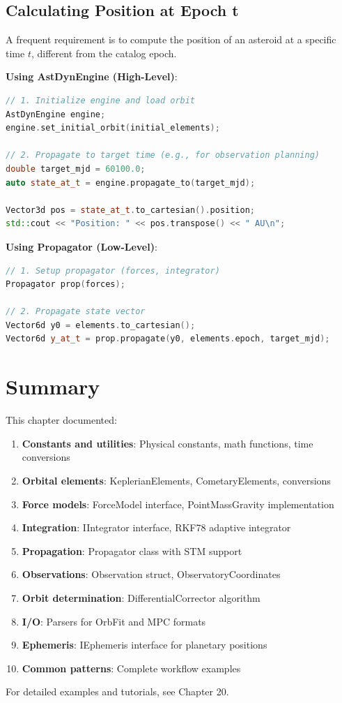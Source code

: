 \subsection{Calculating Position at Epoch t}

A frequent requirement is to compute the position of an asteroid at a specific time $t$, different from the catalog epoch.

\textbf{Using AstDynEngine (High-Level)}:
\begin{lstlisting}[language=C++]
// 1. Initialize engine and load orbit
AstDynEngine engine;
engine.set_initial_orbit(initial_elements);

// 2. Propagate to target time (e.g., for observation planning)
double target_mjd = 60100.0;
auto state_at_t = engine.propagate_to(target_mjd);

Vector3d pos = state_at_t.to_cartesian().position;
std::cout << "Position: " << pos.transpose() << " AU\n";
\end{lstlisting}

\textbf{Using Propagator (Low-Level)}:
\begin{lstlisting}[language=C++]
// 1. Setup propagator (forces, integrator)
Propagator prop(forces);

// 2. Propagate state vector
Vector6d y0 = elements.to_cartesian();
Vector6d y_at_t = prop.propagate(y0, elements.epoch, target_mjd);
\end{lstlisting}

\section{Summary}

This chapter documented:

\begin{enumerate}
    \item \textbf{Constants and utilities}: Physical constants, math functions, time conversions
    \item \textbf{Orbital elements}: KeplerianElements, CometaryElements, conversions
    \item \textbf{Force models}: ForceModel interface, PointMassGravity implementation
    \item \textbf{Integration}: IIntegrator interface, RKF78 adaptive integrator
    \item \textbf{Propagation}: Propagator class with STM support
    \item \textbf{Observations}: Observation struct, ObservatoryCoordinates
    \item \textbf{Orbit determination}: DifferentialCorrector algorithm
    \item \textbf{I/O}: Parsers for OrbFit and MPC formats
    \item \textbf{Ephemeris}: IEphemeris interface for planetary positions
    \item \textbf{Common patterns}: Complete workflow examples
\end{enumerate}

For detailed examples and tutorials, see Chapter 20.
